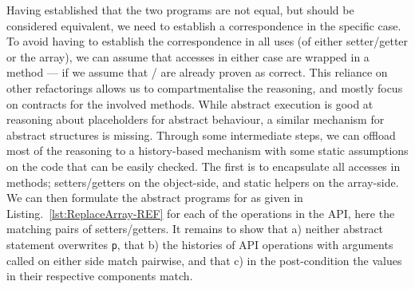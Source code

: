 Having established that the two programs are not equal, but should be considered equivalent,
we need to establish a correspondence in the specific case.
To avoid having to establish the correspondence in all uses (of either setter/getter or the array),
we can assume that accesses in either case are wrapped in a method --- if we assume that / are already proven as correct.
This reliance on other refactorings allows us to compartmentalise the reasoning, and mostly focus on contracts for the involved methods.
While abstract execution is good at reasoning about placeholders for abstract behaviour, a similar mechanism for abstract structures is missing.
Through some intermediate steps, we can offload most of the reasoning to a history-based mechanism with some static assumptions on the code that can be easily checked.
The first is to encapsulate all accesses in methods; setters/getters on the object-side, and static helpers on the array-side.
We can then formulate the abstract programs for \Refinity{} as given in Listing.~\ref{lst:ReplaceArray-REF} for each of the operations in the API, here the matching pairs of setters/getters.
It remains to show that a) neither abstract statement overwrites \texttt{p}, that b) the histories of API operations with arguments called on either side match pairwise,
and that c) in the post-condition the values in their respective components match.





